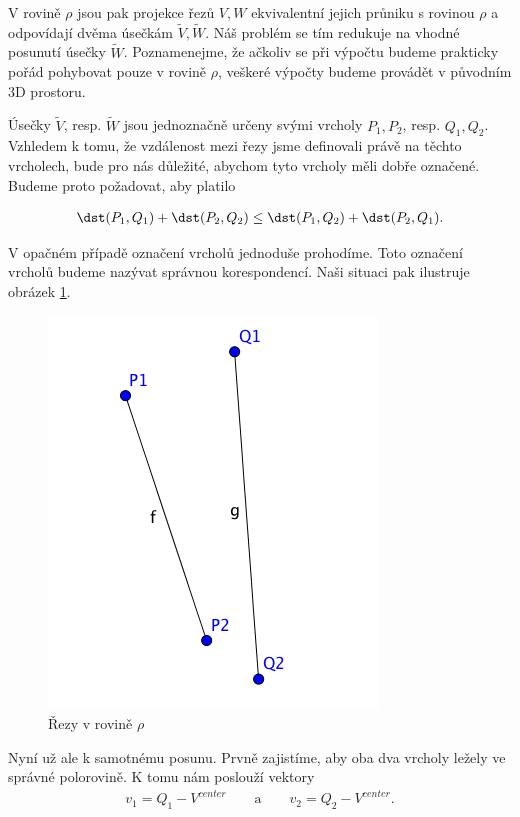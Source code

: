 V rovině $ \rho $ jsou pak projekce řezů $ V, W $ ekvivalentní jejich průniku
s rovinou $ \rho $ a odpovídají dvěma úsečkám $ \widetilde{V}, \widetilde{W} $.
Náš problém se tím redukuje na vhodné posunutí úsečky $ \widetilde{W} $.
Poznamenejme, že ačkoliv se při výpočtu budeme prakticky pořád pohybovat pouze
v rovině $ \rho $, veškeré výpočty budeme provádět v původním 3D prostoru.

Úsečky $ \widetilde{V} $, resp.
$ \widetilde{W} $ jsou jednoznačně určeny svými vrcholy $ P_1, P_2 $, resp. $ Q_1, Q_2 $.
Vzhledem k tomu, že vzdálenost mezi řezy jsme definovali právě na těchto vrcholech,
bude pro nás důležité, abychom tyto vrcholy měli dobře označené. Budeme proto
požadovat, aby platilo

\begin{align*}
    \dst(P_1, Q_1) + \dst(P_2, Q_2) \leq \dst(P_1, Q_2) + \dst(P_2, Q_1).
\end{align*}

V opačném případě označení vrcholů jednoduše prohodíme. Toto označení vrcholů
budeme nazývat správnou korespondencí. Naši situaci pak ilustruje obrázek
\ref{fig:segments_basic}.

\begin{figure}[ht]
    \centering
    \includegraphics{img/segments_basic.png}
    \caption{Řezy v rovině $ \rho $}
  \centering
  \label{fig:segments_basic}
\end{figure}

Nyní už ale k samotnému posunu. Prvně zajistíme, aby oba dva vrcholy ležely ve
správné polorovině. K tomu nám poslouží vektory
\begin{align*}
    v_1 = Q_1 - V^{center} \qquad\text{a}\qquad v_2 = Q_2 - V^{center}.
\end{align*}

